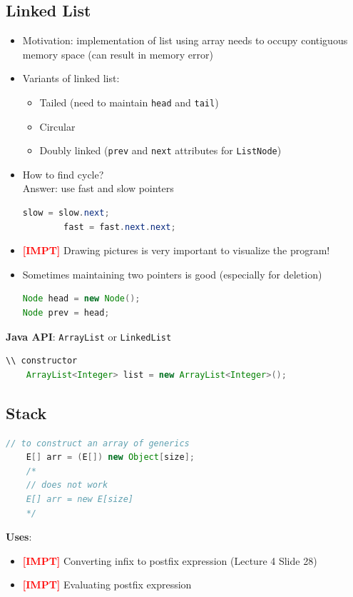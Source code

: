 \documentclass{article}
\newcommand{\impt}[0]{\textcolor{red}{\textbf{[IMPT] }}}
\begin{document}
\begin{multicols}{2}
\subsection{Linked List}
\begin{itemize}
	\item Motivation: implementation of list using array needs to occupy contiguous memory space (can result in memory error)
	\item Variants of linked list:
	\begin{itemize}
		\item Tailed (need to maintain \texttt{head} and \texttt{tail})
		\item Circular
		\item Doubly linked (\texttt{prev} and \texttt{next} attributes for \texttt{ListNode})
	\end{itemize}
	\item How to find cycle?\\
	Answer: use fast and slow pointers
	\begin{lstlisting}[language=java]
		slow = slow.next;
		fast = fast.next.next;\end{lstlisting}
	\item \impt Drawing pictures is very important to visualize the program!
	\item Sometimes maintaining two pointers is good (especially for deletion)
	\begin{lstlisting}[language=Java]
Node head = new Node();
Node prev = head;
\end{lstlisting}
\end{itemize}

\textbf{Java API}: \texttt{ArrayList} or \texttt{LinkedList}
\begin{lstlisting}[language=Java]
	\\ constructor
	ArrayList<Integer> list = new ArrayList<Integer>();
\end{lstlisting}

\subsection{Stack}
\begin{lstlisting}[language=Java]
	// to construct an array of generics
	E[] arr = (E[]) new Object[size];
	/*
	// does not work
	E[] arr = new E[size]
	*/
\end{lstlisting}
\textbf{Uses}:
\begin{itemize}
	\item \impt Converting infix to postfix expression (Lecture 4 Slide 28)
	\item \impt Evaluating postfix expression
\end{itemize}


\end{multicols}
\end{document}
